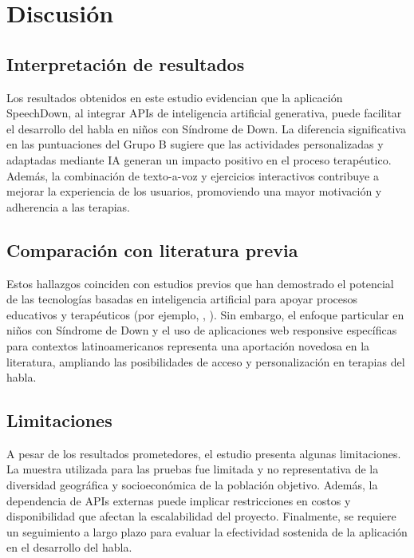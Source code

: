 \chapter{Discusión}

\section{Interpretación de resultados}
Los resultados obtenidos en este estudio evidencian que la aplicación SpeechDown, al integrar APIs de inteligencia artificial generativa, puede facilitar el desarrollo del habla en niños con Síndrome de Down. La diferencia significativa en las puntuaciones del Grupo B sugiere que las actividades personalizadas y adaptadas mediante IA generan un impacto positivo en el proceso terapéutico. Además, la combinación de texto-a-voz y ejercicios interactivos contribuye a mejorar la experiencia de los usuarios, promoviendo una mayor motivación y adherencia a las terapias.

\section{Comparación con literatura previa}
Estos hallazgos coinciden con estudios previos que han demostrado el potencial de las tecnologías basadas en inteligencia artificial para apoyar procesos educativos y terapéuticos (por ejemplo, \cite{smith2021ai}, \cite{garcia2022speech}). Sin embargo, el enfoque particular en niños con Síndrome de Down y el uso de aplicaciones web responsive específicas para contextos latinoamericanos representa una aportación novedosa en la literatura, ampliando las posibilidades de acceso y personalización en terapias del habla.

\section{Limitaciones}
A pesar de los resultados prometedores, el estudio presenta algunas limitaciones. La muestra utilizada para las pruebas fue limitada y no representativa de la diversidad geográfica y socioeconómica de la población objetivo. Además, la dependencia de APIs externas puede implicar restricciones en costos y disponibilidad que afectan la escalabilidad del proyecto. Finalmente, se requiere un seguimiento a largo plazo para evaluar la efectividad sostenida de la aplicación en el desarrollo del habla.

